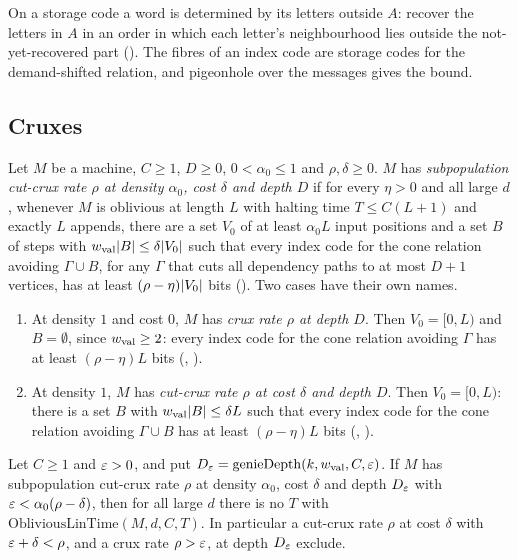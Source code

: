 \begin{outline}
On a storage code a word is determined by its letters outside $A$: recover the letters in $A$ in an order in which each letter's
neighbourhood lies outside the not-yet-recovered part (). The fibres of an index code are storage
codes for the demand-shifted relation, and pigeonhole over the messages gives the bound.
\end{outline}

\subsection{Cruxes}

\begin{definition}[Cruxes]\label{def:crux}
Let $M$ be a machine, $C\ge1$, $D\ge0$, $0<\alpha_0\le1$ and $\rho,\delta\ge0$. $M$ has \emph{subpopulation cut-crux rate $\rho$ at
density $\alpha_0$, cost $\delta$ and depth $D$} if for every $\eta>0$ and all large $d$, whenever $M$ is oblivious at length $L$
with halting time $T\le C(L+1)$ and exactly $L$ appends, there are a set $V_0$ of at least $\alpha_0L$ input positions and a set $B$
of steps with $w_{\mathrm{val}}\lvert B \rvert\le\delta\lvert V_0 \rvert$ such that every index code for the cone relation avoiding $\Gamma\cup B$, for any
$\Gamma$ that cuts all dependency paths to at most $D+1$ vertices, has at least $(\rho-\eta)\lvert V_0 \rvert$ bits ().
Two cases have their own names.
\begin{enumerate}[label=(\alph*)]
\item At density $1$ and cost $0$, $M$ has \emph{crux rate $\rho$ at depth $D$}. Then $V_0=[0,L)$ and $B=\emptyset$, since $w_{\mathrm{val}}\ge2$:
every index code for the cone relation avoiding $\Gamma$ has at least $(\rho-\eta)L$ bits (,
).
\item At density $1$, $M$ has \emph{cut-crux rate $\rho$ at cost $\delta$ and depth $D$}. Then $V_0=[0,L)$: there is a set $B$ with
$w_{\mathrm{val}}\lvert B \rvert\le\delta L$ such that every index code for the cone relation avoiding $\Gamma\cup B$ has at least $(\rho-\eta)L$ bits
(, ).
\end{enumerate}
\end{definition}

\begin{theorem}\label{thm:crux-excludes}
Let $C\ge1$ and $\varepsilon>0$, and put $D_\varepsilon=\mathrm{genieDepth}(k,w_{\mathrm{val}},C,\varepsilon)$. If $M$ has subpopulation cut-crux rate $\rho$ at
density $\alpha_0$, cost $\delta$ and depth $D_\varepsilon$ with $\varepsilon<\alpha_0(\rho-\delta)$, then for all large $d$ there is no $T$ with
$\mathrm{ObliviousLinTime}(M,d,C,T)$. In particular a cut-crux rate $\rho$ at cost $\delta$ with $\varepsilon+\delta<\rho$, and a crux rate
$\rho>\varepsilon$, at depth $D_\varepsilon$ exclude.
\end{theorem}

